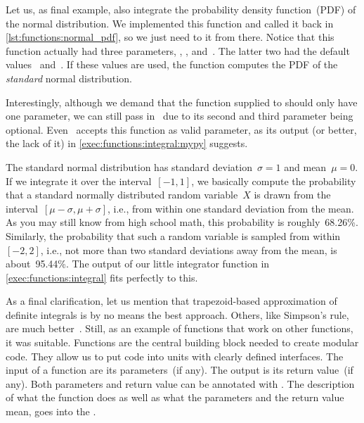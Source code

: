 Let us, as final example, also integrate the probability density function~(PDF) of the normal distribution.
We implemented this function and called it  back in \cref{lst:functions:normal_pdf}, so we just need to  it from there.
Notice that this function actually had three parameters, , , and~.
The latter two had the default values~ and~.
If these values are used, the function computes the PDF of the \emph{standard} normal distribution.

%

Interestingly, although we demand that the function supplied to  should only have one parameter, we can still pass in~ due to its second and third parameter being optional.
Even \mypy\ accepts this function as valid parameter, as its output (or better, the lack of it) in \cref{exec:functions:integral:mypy} suggests.

The standard normal distribution has standard deviation~$\sigma=1$ and mean~$\mu=0$.
If we integrate it over the interval~$[-1,1]$, we basically compute the probability that a standard normally distributed random variable~$X$ is drawn from the interval~$[\mu-\sigma,\mu+\sigma]$, i.e., from within one standard deviation from the mean.
As you may still know from high school math, this probability is roughly~68.26\%.
Similarly, the probability that such a random variable is sampled from within~$[-2,2]$, i.e., not more than two standard deviations away from the mean, is about~95.44\%.
The output of our little integrator function in \cref{exec:functions:integral} fits perfectly to this.

As a final clarification, let us mention that trapezoid-based approximation of definite integrals is by no means the best approach.
Others, like Simpson's rule, are much better~\cite{E2013AITNMAA}.
Still, as an example of functions that work on other functions, it was suitable.%
\FloatBarrier%
\endhsection%
%
%
Functions are the central building block needed to create modular code.
They allow us to put code into units with clearly defined interfaces.
The input of a function are its parameters~(if any).
The output is its return value~(if any).
Both parameters and return value can be annotated with .
The description of what the function does as well as what the parameters and the return value mean, goes into the .

